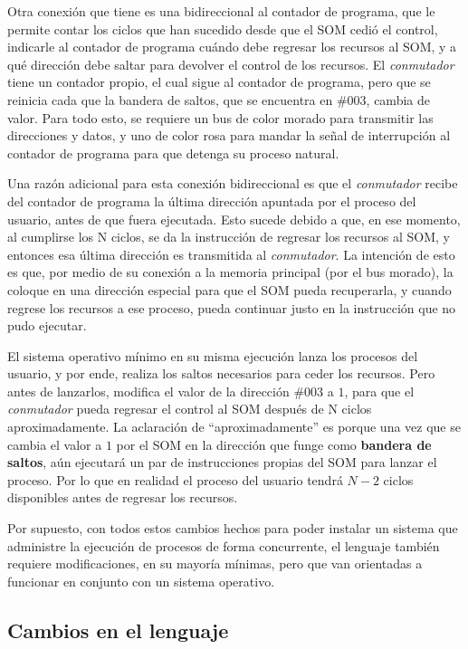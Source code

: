 \documentclass[letterpaper,12pt,oneside]{book}
\begin{document}
        Otra conexión que tiene es una bidireccional al contador de programa, que le permite contar los ciclos que han sucedido desde que el SOM cedió el control, indicarle al contador de programa cuándo debe regresar los recursos al SOM, y a qué dirección
		debe saltar para devolver el control de los recursos. El \textit{conmutador} tiene un contador propio, el cual sigue al contador de programa, pero que se reinicia cada que la bandera de saltos, que se encuentra en \#003, cambia de valor.
        Para todo esto, se requiere un bus de color morado para transmitir las direcciones y datos, y uno de color rosa para mandar la señal
        de interrupción al contador de programa para que detenga su proceso natural.
  
        Una razón adicional para esta conexión bidireccional es que el \textit{conmutador} recibe del contador de programa la última dirección
		apuntada por el proceso del usuario, antes de que fuera ejecutada. Esto sucede debido a que, en ese momento, al cumplirse los N ciclos, se da la instrucción de regresar los recursos al SOM, y entonces esa última dirección es transmitida al \textit{conmutador}. La intención de esto es que, por medio de su conexión a la memoria principal (por el bus morado),
		la coloque en una dirección especial para que el SOM pueda recuperarla, y cuando regrese los recursos a ese proceso, pueda continuar
		justo en la instrucción que no pudo ejecutar.
		
		El sistema operativo mínimo en su misma ejecución lanza los procesos del usuario, y por ende, realiza los saltos necesarios para ceder los recursos. Pero antes de lanzarlos,		
		modifica el valor de la dirección $\#003$ a $1$, para que el \textit{conmutador} pueda regresar el control al SOM después de N ciclos aproximadamente. La aclaración de ``aproximadamente'' es porque
		una vez que se cambia el valor a $1$ por el SOM en la dirección que funge como \textbf{bandera de saltos}, aún ejecutará un par de instrucciones propias
		del SOM para lanzar el proceso. Por lo que en realidad el proceso del usuario tendrá $N-2$ ciclos disponibles antes de regresar los recursos.
		
		Por supuesto, con todos estos cambios hechos para poder instalar un sistema que administre la ejecución de procesos de forma concurrente, el lenguaje también
		requiere modificaciones, en su mayoría mínimas, pero que van orientadas a funcionar en conjunto con un sistema operativo.
		
		\subsection{Cambios en el lenguaje}
		
\end{document}
